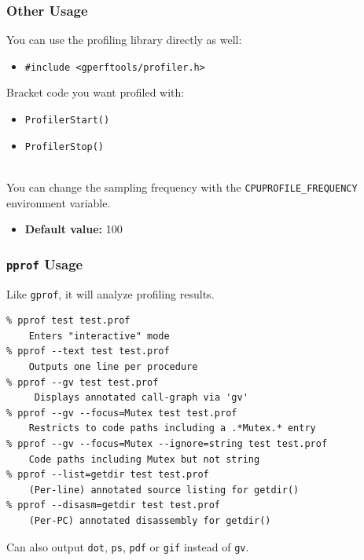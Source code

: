 \begin{frame}[fragile]
  \frametitle{Other Usage}


\begin{changemargin}{1.5cm}
  
     You can use the profiling library directly as well:
      \begin{itemize}
        \item {\tt \#include <gperftools/profiler.h>}
      \end{itemize}
     Bracket code you want profiled with:
      \begin{itemize}
        \item {\tt ProfilerStart()}
        \item {\tt ProfilerStop()}
      \end{itemize}~\\
    
    You can change the sampling frequency with the
      {\tt CPUPROFILE\_FREQUENCY} environment variable.
      \begin{itemize}
        \item {\bf Default value:} 100
      \end{itemize}
      \end{changemargin}
\end{frame}

\begin{frame}[fragile]
  \frametitle{{\tt pprof} Usage}



\begin{changemargin}{1.5cm}
    Like {\tt gprof}, it will analyze profiling results.

  \begin{lstlisting}
% pprof test test.prof
    Enters "interactive" mode
% pprof --text test test.prof
    Outputs one line per procedure
% pprof --gv test test.prof
     Displays annotated call-graph via 'gv'
% pprof --gv --focus=Mutex test test.prof
    Restricts to code paths including a .*Mutex.* entry
% pprof --gv --focus=Mutex --ignore=string test test.prof
    Code paths including Mutex but not string
% pprof --list=getdir test test.prof
    (Per-line) annotated source listing for getdir()
% pprof --disasm=getdir test test.prof
    (Per-PC) annotated disassembly for getdir()
  \end{lstlisting}

    Can also output {\tt dot}, {\tt ps}, {\tt pdf} or {\tt gif} instead of
      {\tt gv}.
      \end{changemargin}

\end{frame}

